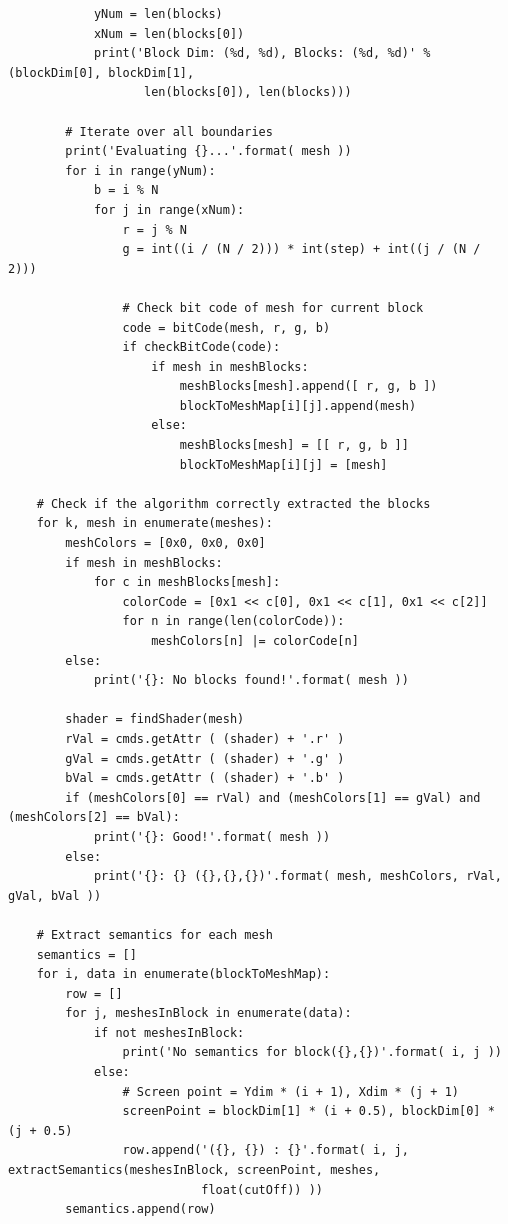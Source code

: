 \documentclass[conference]{IEEEtran}
\begin{document}
{{\begin{verbatim}
            yNum = len(blocks)
            xNum = len(blocks[0])
            print('Block Dim: (%d, %d), Blocks: (%d, %d)' % (blockDim[0], blockDim[1],
                   len(blocks[0]), len(blocks)))
    
        # Iterate over all boundaries
        print('Evaluating {}...'.format( mesh ))
        for i in range(yNum):
            b = i % N
            for j in range(xNum):
                r = j % N
                g = int((i / (N / 2))) * int(step) + int((j / (N / 2)))
                            
                # Check bit code of mesh for current block
                code = bitCode(mesh, r, g, b)
                if checkBitCode(code):
                    if mesh in meshBlocks:
                        meshBlocks[mesh].append([ r, g, b ])
                        blockToMeshMap[i][j].append(mesh)
                    else:
                        meshBlocks[mesh] = [[ r, g, b ]]
                        blockToMeshMap[i][j] = [mesh]
                        
    # Check if the algorithm correctly extracted the blocks
    for k, mesh in enumerate(meshes):
        meshColors = [0x0, 0x0, 0x0]
        if mesh in meshBlocks:
            for c in meshBlocks[mesh]:
                colorCode = [0x1 << c[0], 0x1 << c[1], 0x1 << c[2]]
                for n in range(len(colorCode)):
                    meshColors[n] |= colorCode[n]
        else:
            print('{}: No blocks found!'.format( mesh ))
        
        shader = findShader(mesh)
        rVal = cmds.getAttr ( (shader) + '.r' )
        gVal = cmds.getAttr ( (shader) + '.g' )
        bVal = cmds.getAttr ( (shader) + '.b' )
        if (meshColors[0] == rVal) and (meshColors[1] == gVal) and (meshColors[2] == bVal):
            print('{}: Good!'.format( mesh ))
        else:
            print('{}: {} ({},{},{})'.format( mesh, meshColors, rVal, gVal, bVal ))
            
    # Extract semantics for each mesh
    semantics = []
    for i, data in enumerate(blockToMeshMap):
        row = []
        for j, meshesInBlock in enumerate(data):
            if not meshesInBlock:
                print('No semantics for block({},{})'.format( i, j ))
            else:
                # Screen point = Ydim * (i + 1), Xdim * (j + 1)
                screenPoint = blockDim[1] * (i + 0.5), blockDim[0] * (j + 0.5)
                row.append('({}, {}) : {}'.format( i, j, extractSemantics(meshesInBlock, screenPoint, meshes,
                           float(cutOff)) ))
        semantics.append(row)
    

\end{verbatim}}}
\end{document}

